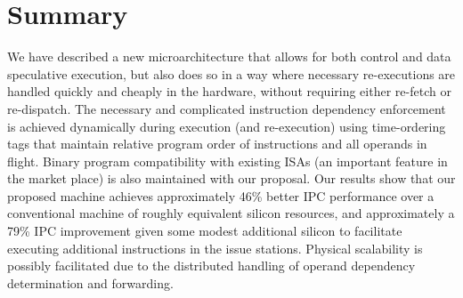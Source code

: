 \documentclass[10pt,dvips]{article}
\begin{document}
\section{Summary}
%
We have described a new microarchitecture that
allows for both control and data speculative execution,
but also does so 
in a way where necessary re-executions are handled
quickly and cheaply in the hardware, without requiring either
re-fetch or re-dispatch.  
The necessary and complicated instruction dependency
enforcement is achieved dynamically during execution (and re-execution)
using time-ordering tags that maintain relative program order
of instructions and all operands in flight.
Binary program compatibility with existing ISAs (an important feature
in the market place) is also maintained with our proposal.
Our results show that our proposed machine achieves approximately
46\% better IPC performance over a conventional machine of roughly
equivalent silicon resources, and approximately a 79\%
IPC improvement given some modest additional silicon to facilitate
executing additional instructions in the issue stations.
Physical scalability is possibly facilitated due to the distributed
handling of operand dependency determination and forwarding.
%


%
\end{document}
